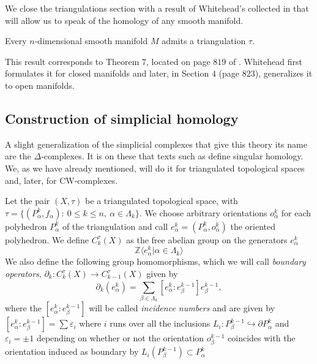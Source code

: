 \bigskip

We close the triangulations section with a result of Whitehead's collected in \cite{Whitehead1978} that will allow us to speak of the homology of any smooth manifold.

\begin{theorem}
    Every $n$-dimensional smooth manifold $M$ admits a triangulation $\tau$.
\end{theorem}

This result corresponds to Theorem $7$, located on page $819$ of \cite{Whitehead1978}. Whitehead first formulates it for closed manifolds and later, in Section $4$ (page $823$), generalizes it to open manifolds.
\bigskip


\subsection{Construction of simplicial homology}

A slight generalization of the simplicial complexes that give this theory its name are the $\Delta$-complexes. It is on these that texts such as \cite{hatcher2002} define singular homology. We, as we have already mentioned, will do it for triangulated topological spaces and, later, for CW-complexes.

\bigskip

\begin{definition}
    Let the pair $(X,\tau)$ be a triangulated topological space, with $\tau = \{(P^k_{\alpha}, f_{\alpha}): ~0\le k \le n, ~\alpha\in \Lambda_k\}$. We choose arbitrary orientations $o^k_{\alpha}$ for each polyhedron $P^k_{\alpha}$ of the triangulation and call $e^k_{\alpha}=(P^k_{\alpha},o^k_{\alpha})$ the oriented polyhedron. We define $C^{\tau}_k(X)$ as the free abelian group on the generators $e^k_{\alpha}$
    \begin{equation*}
        \mathbb{Z}\langle e^k_{\alpha} | \alpha \in \Lambda_k \rangle
    \end{equation*}
    We also define the following group homomorphisms, which we will call \textit{boundary operators}, $\partial_k: C^{\tau}_k(X) \to C^{\tau}_{k-1}(X)$ given by
    \begin{equation*}
        \partial_k(e^k_{\alpha}) = \sum_{\beta\in\Lambda_k} [e^k_{\alpha} : e^{k-1}_{\beta}]e^{k-1}_{\beta}, %
    \end{equation*}
    where the $[e^k_{\alpha} : e^{k-1}_{\beta}]$ will be called \textit{incidence numbers} and are given by $[e^k_{\alpha} : e^{k-1}_{\beta}] = \sum \varepsilon_i$ where $i$ runs over all the inclusions $L_i: P^{k-1}_{\beta} \hookrightarrow \partial P^k_{\alpha}$ and $\varepsilon_i=\pm 1$ depending on whether or not the orientation $o^{k-1}_{\beta}$ coincides with the orientation induced as boundary by $L_i(P^{k-1}_{\beta})\subset P^k_{\alpha}$
\end{definition}

